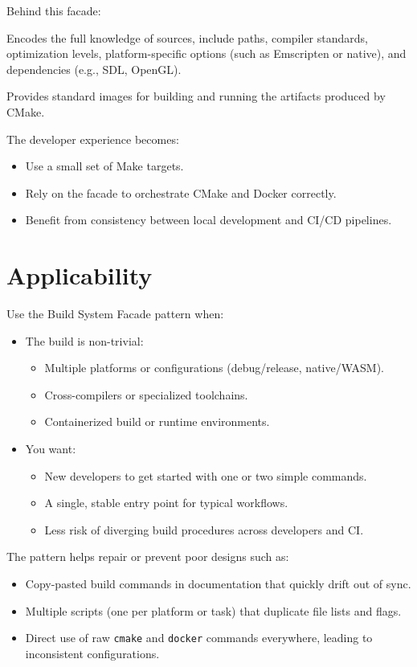 \documentclass[11pt]{article}
\begin{document}
Behind this facade:
\begin{description}[style=nextline]
  \item[CoreBuilder (CMake):] Encodes the full knowledge of sources, include paths, compiler standards, optimization levels, platform-specific options (such as Emscripten or native), and dependencies (e.g., SDL, OpenGL).
  \item[ContainerRuntime (Docker):] Provides standard images for building and running the artifacts produced by CMake.
\end{description}

The developer experience becomes:
\begin{itemize}[noitemsep]
  \item Use a small set of Make targets.
  \item Rely on the facade to orchestrate CMake and Docker correctly.
  \item Benefit from consistency between local development and CI/CD pipelines.
\end{itemize}

\section{Applicability}

Use the Build System Facade pattern when:
\begin{itemize}[noitemsep]
  \item The build is non-trivial:
    \begin{itemize}[noitemsep]
      \item Multiple platforms or configurations (debug/release, native/WASM).
      \item Cross-compilers or specialized toolchains.
      \item Containerized build or runtime environments.
    \end{itemize}
  \item You want:
    \begin{itemize}[noitemsep]
      \item New developers to get started with one or two simple commands.
      \item A single, stable entry point for typical workflows.
      \item Less risk of diverging build procedures across developers and CI.
    \end{itemize}
\end{itemize}

The pattern helps repair or prevent poor designs such as:
\begin{itemize}[noitemsep]
  \item Copy-pasted build commands in documentation that quickly drift out of sync.
  \item Multiple scripts (one per platform or task) that duplicate file lists and flags.
  \item Direct use of raw \texttt{cmake} and \texttt{docker} commands everywhere, leading to inconsistent configurations.
\end{itemize}
\end{document}
